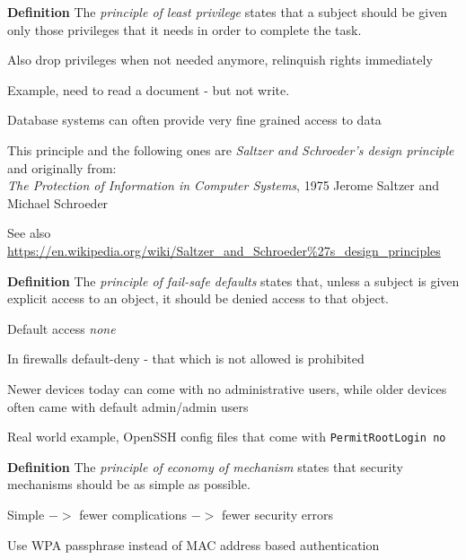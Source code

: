 \documentclass[Screen16to9,17pt]{foils}
\begin{document}

\begin{list1}
\item {\bf Definition} The \emph{principle of least privilege} states that a subject should be given only those privileges that it needs in order to complete the task.
\item Also drop privileges when not needed anymore, relinquish rights immediately
\item Example, need to read a document - but not write.
\item Database systems can often provide very fine grained access to data
\end{list1}

This principle and the following ones are \emph{Saltzer and Schroeder's design principle} and originally from:\\
\emph{The Protection of Information in Computer Systems}, 1975 Jerome Saltzer and Michael Schroeder

See also
\url{https://en.wikipedia.org/wiki/Saltzer_and_Schroeder%27s_design_principles}



\begin{list1}
\item {\bf Definition} The \emph{principle of fail-safe defaults} states that, unless a subject is given explicit access to an object, it should be denied access to that object.
\item Default access \emph{none}
\item In firewalls default-deny - that which is not allowed is prohibited
\item Newer devices today can come with no administrative users, while older devices often came with default admin/admin users
\item Real world example, OpenSSH config files that come with \verb+PermitRootLogin no+
\end{list1}



\begin{list1}
\item {\bf Definition} The \emph{principle of economy of mechanism} states that security mechanisms should be as simple as possible.
\item Simple $->$ fewer complications $->$ fewer security errors
\item Use WPA passphrase instead of MAC address based authentication
\item
\end{list1}
\end{document}
